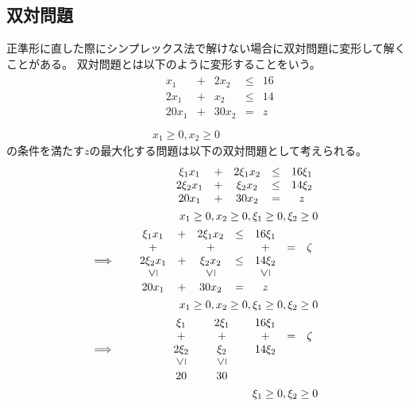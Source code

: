 \documentclass[dvipdfmx,titlepage, a4paper]{jsarticle}%
\begin{document}
\subsection{双対問題}
正準形に直した際にシンプレックス法で解けない場合に双対問題に変形して解くことがある。
双対問題とは以下のように変形することをいう。
\begin{eqnarray*}
	&&\begin{array}{cccccc}
		& x_{1} & + & 2x_{2} & \leq & 16\\
		& 2x_{1} & + & x_{2} & \leq & 14\\
		& 20x_{1} & + & 30x_{2} & = & z\\
	\end{array}\\
	&&x_{1} \geq 0, x_{2} \geq 0
\end{eqnarray*}
の条件を満たす$z$の最大化する問題は以下の双対問題として考えられる。
\begin{eqnarray*}
	&&\begin{array}{cccccc}
		& \xi_{1}x_{1} & + & 2\xi_{1}x_{2} & \leq & 16\xi_{1}\\
		& 2\xi_{2}x_{1} & + & \xi_{2}x_{2} & \leq & 14\xi_{2}\\
		& 20x_{1} & + & 30x_{2} & = & z\\
	\end{array}\\
	&&x_{1} \geq 0, x_{2} \geq 0, \xi_{1} \geq 0, \xi_{2} \geq 0\\
	\Longrightarrow
	&&\begin{array}{cccccccc}
		& \xi_{1}x_{1} & + & 2\xi_{1}x_{2} & \leq & 16\xi_{1} & \; & \;\\
		& + & \; & + & \; & + & = & \zeta \\
		& 2\xi_{2}x_{1} & + & \xi_{2}x_{2} & \leq & 14\xi_{2}& \; & \;\\
		& \mbox{\rotatebox{90}{$\leq$}} & \; & \mbox{\rotatebox{90}{$\leq$}} & \; & \mbox{\rotatebox{90}{$\leq$}} & \; & \; \\
		& 20x_{1} & + & 30x_{2} & = & z & \; & \;\\
	\end{array}\\
	&&x_{1} \geq 0, x_{2} \geq 0, \xi_{1} \geq 0, \xi_{2} \geq 0\\
	\Longrightarrow
	&&\begin{array}{cccccccc}
		& \xi_{1} & \; & 2\xi_{1} & \; & 16\xi_{1} & \; & \;\\
		& + & \; & + & \; & + & = & \zeta \\
		& 2\xi_{2} & \; & \xi_{2} & \; & 14\xi_{2}& \; & \;\\
		& \mbox{\rotatebox{90}{$\leq$}} & \; & \mbox{\rotatebox{90}{$\leq$}} & \; & \; & \; & \; \\
		& 20 & \; & 30 & \; & \; & \; & \;\\
	\end{array}\\
	&&\xi_{1} \geq 0, \xi_{2} \geq 0\\
\end{eqnarray*}
\end{document}
